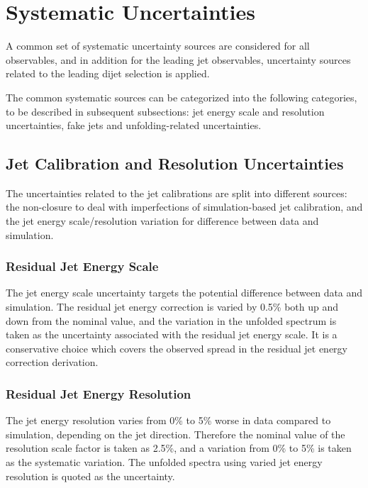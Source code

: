 \section{Systematic Uncertainties}\label{Section:Systematics}

A common set of systematic uncertainty sources are considered for all observables, and in addition for the leading jet observables, uncertainty sources related to the leading dijet selection is applied.

The common systematic sources can be categorized into the following categories, to be described in subsequent subsections: jet energy scale and resolution uncertainties, fake jets and unfolding-related uncertainties.

\subsection{Jet Calibration and Resolution Uncertainties}

The uncertainties related to the jet calibrations are split into different sources: the non-closure to deal with imperfections of simulation-based jet calibration, and the jet energy scale/resolution variation for difference between data and simulation.

\subsubsection{Residual Jet Energy Scale}

The jet energy scale uncertainty targets the potential difference between data and simulation.  The residual jet energy correction is varied by 0.5\% both up and down from the nominal value, and the variation in the unfolded spectrum is taken as the uncertainty associated with the residual jet energy scale.  It is a conservative choice which covers the observed spread in the residual jet energy correction derivation.

\subsubsection{Residual Jet Energy Resolution}

The jet energy resolution varies from 0\% to 5\% worse in data compared to simulation, depending on the jet direction.  Therefore the nominal value of the resolution scale factor is taken as 2.5\%, and a variation from 0\% to 5\% is taken as the systematic variation.  The unfolded spectra using varied jet energy resolution is quoted as the uncertainty.

